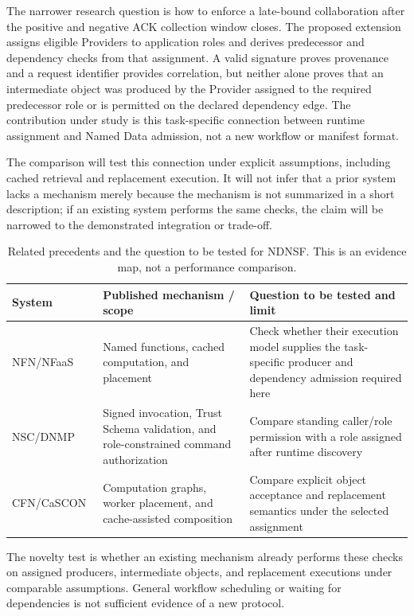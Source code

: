 The narrower research question is how to enforce a late-bound collaboration after the positive and negative ACK collection window closes. The proposed extension assigns eligible Providers to application roles and derives predecessor and dependency checks from that assignment. A valid signature proves provenance and a request identifier provides correlation, but neither alone proves that an intermediate object was produced by the Provider assigned to the required predecessor role or is permitted on the declared dependency edge. The contribution under study is this task-specific connection between runtime assignment and Named Data admission, not a new workflow or manifest format.

The comparison will test this connection under explicit assumptions, including cached retrieval and replacement execution. It will not infer that a prior system lacks a mechanism merely because the mechanism is not summarized in a short description; if an existing system performs the same checks, the claim will be narrowed to the demonstrated integration or trade-off.

\begin{table}[htbp]\centering\small
\caption{Related precedents and the question to be tested for NDNSF. This is an evidence map, not a performance comparison.}
\begin{tabularx}{\textwidth}{p{}XX}
\toprule System & Published mechanism / scope & Question to be tested and limit\\\midrule
NFN/NFaaS~\cite{nfn,nfaas} & Named functions, cached computation, and placement & Check whether their execution model supplies the task-specific producer and dependency admission required here\\\midrule
NSC/DNMP~\cite{nsc,dnmp} & Signed invocation, Trust Schema validation, and role-constrained command authorization & Compare standing caller/role permission with a role assigned after runtime discovery\\\midrule
CFN/CaSCON~\cite{cfn,cascon} & Computation graphs, worker placement, and cache-assisted composition & Compare explicit object acceptance and replacement semantics under the selected assignment\\\bottomrule
\end{tabularx}\end{table}

The novelty test is whether an existing mechanism already performs these checks on assigned producers, intermediate objects, and replacement executions under comparable assumptions. General workflow scheduling or waiting for dependencies is not sufficient evidence of a new protocol.

